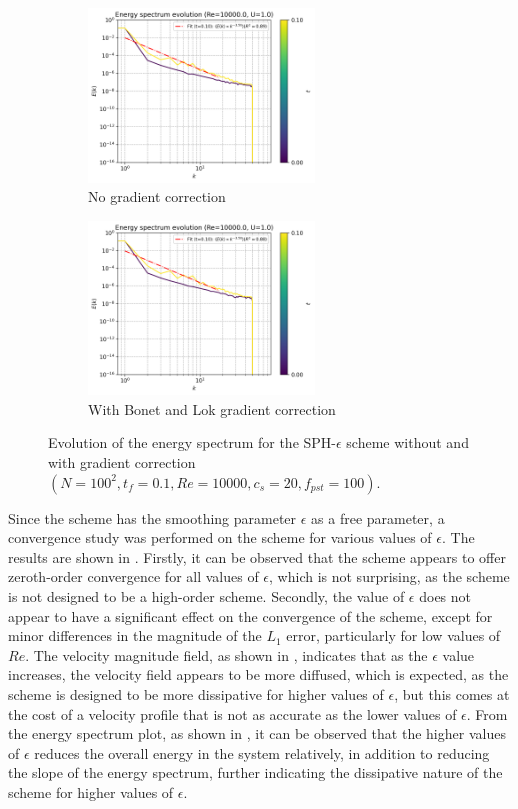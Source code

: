 \begin{figure}[htbp!]
  \begin{subfigure}{7cm}
  \centering\includegraphics[width=6cm]{Code-Figures/mon2017/grad_corr/c0_20_tait_pec_dtmul_1_mkc_no_nx_100_pst_10_re_10000_mon2017/energy_spectrum_evolution.png}
  \caption{No gradient correction}
  \end{subfigure}
  \begin{subfigure}{7cm}
  \centering\includegraphics[width=6cm]{Code-Figures/mon2017/grad_corr/c0_20_tait_pec_dtmul_1_mkc_yes_nx_100_pst_10_re_10000_mon2017/energy_spectrum_evolution.png}
  \caption{With Bonet and Lok gradient correction}
  \end{subfigure}
  \caption{Evolution of the energy spectrum for the SPH-$\epsilon$ scheme without and with gradient correction $(N=100^2, t_f=0.1, Re=10000, c_s=20, f_{pst}=100)$.}
  \label{fig:sph-eps-grad-corr-espec}
\end{figure}

Since the scheme has the smoothing parameter $\epsilon$ as a free parameter, a convergence study was performed on the scheme for various values of $\epsilon$.
The results are shown in . Firstly, it can be observed that the scheme appears to offer zeroth-order convergence for all values of $\epsilon$, which is not surprising, as the scheme is not designed to be a high-order scheme. Secondly, the value of $\epsilon$ does not appear to have a significant effect on the convergence of the scheme, except for minor differences in the magnitude of the $L_1$ error, particularly for low values of $Re$.
The velocity magnitude field, as shown in , indicates that as the $\epsilon$ value increases, the velocity field appears to be more diffused, which is expected, as the scheme is designed to be more dissipative for higher values of $\epsilon$, but this comes at the cost of a velocity profile that is not as accurate as the lower values of $\epsilon$.
From the energy spectrum plot, as shown in , it can be observed that the higher values of $\epsilon$ reduces the overall energy in the system relatively, in addition to reducing the slope of the energy spectrum, further indicating the dissipative nature of the scheme for higher values of $\epsilon$.

